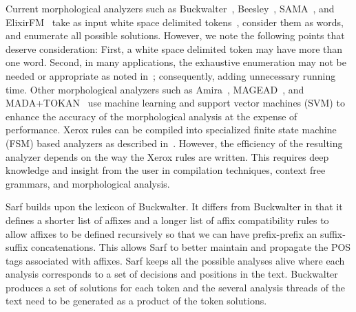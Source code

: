\documentclass[11pt]{article}
\begin{document}
Current morphological analyzers such as 
Buckwalter~,
Beesley~,
SAMA~\cite{Kulick:10},
and ElixirFM~\cite{Otakar:07} 
take as input white space delimited tokens~\cite{Kulick:10},
consider them as words,
and enumerate all possible solutions. 
However, we note the following points that deserve consideration:
First, a white space delimited token may have 
more than one word.
Second, in many applications, the exhaustive enumeration may not be needed or appropriate as noted in~\cite{Maamouri:10}; consequently, adding unnecessary running time.
Other morphological analyzers such as 
Amira~\cite{Diab:07,Benajiba:07},
MAGEAD~\cite{Habash:05}, and MADA+TOKAN~\cite{Habash:09} 
use machine learning and support vector machines (SVM) 
to enhance the accuracy of the morphological analysis at the expense 
of performance. %
Xerox rules can be compiled into specialized finite state
machine (FSM) based analyzers as described in~\cite{Beesley:03}.
However, the efficiency of the resulting analyzer depends on the
way the Xerox rules are written. 
This requires deep knowledge and insight from the user
in compilation techniques, context free grammars, 
and morphological analysis.



Sarf builds upon the lexicon of Buckwalter.
It differs from Buckwalter in that it defines a shorter list of affixes
and a longer list of affix compatibility rules to allow 
affixes to be defined recursively
so that we can have prefix-prefix an suffix-suffix 
concatenations.
This allows Sarf to better maintain and propagate 
the POS tags associated with affixes. 
Sarf keeps all the possible analyses alive where each analysis
corresponds to a set of decisions and positions in the text. 
Buckwalter produces a set of solutions for each token 
and the several analysis threads of the text need to be 
generated as a product of the token solutions. 
\end{document}
